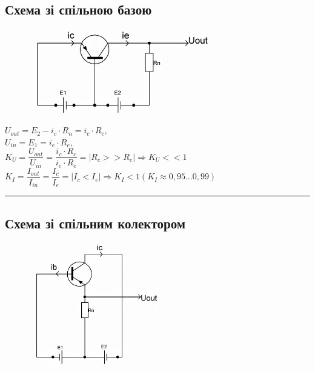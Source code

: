 \documentclass[14pt,a4paper]{scrartcl}
\begin{document}
\subsection{Схема зі спільною базою}
\begin{figure}[!h]\TopFloatBoxes\CenterFloatBoxes
{}
{\includegraphics[width=0.7\textwidth]{combase}}
 \end{figure}

\begin{center}
$U_{out}=E_2-i_c\cdot{R_n}=i_c\cdot{R_c}$,\\[0.5cm]

$U_{in}=E_1=i_e\cdot{R_e}$,\\[0.5cm]

$K_U=\dfrac{U_{out}}{U_{in}}=\dfrac{i_c\cdot{R_c}}{i_e\cdot{R_e}}=\left|R_c>>R_e\right|\Rightarrow \boxed{K_U<<1}$\\[0.5cm]

$K_I=\dfrac{I_{out}}{I_{in}}=\dfrac{I_c}{I_e}=\left|I_c<I_e\right|\Rightarrow \boxed{K_I<1} (K_I\approx 0,95...0,99)$\\[0.5cm]
\end{center}
\medskip\hrule\medskip
\newpage

\subsection{Схема зі спільним колектором}
\begin{figure}[!h]\TopFloatBoxes\CenterFloatBoxes
{}
{\includegraphics[width=0.5\textwidth]{comcol}}
 \end{figure}
\end{document}
